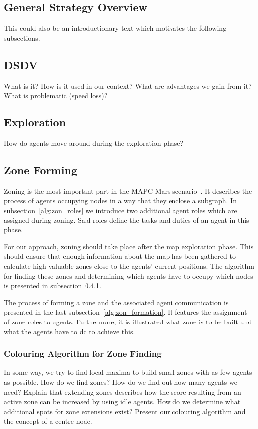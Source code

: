 \subsection{General Strategy Overview}
This could also be an introductionary text which motivates the following subsections.

\subsection{DSDV}
What is it? How is it used in our context? What are advantages we gain from it? What is problematic (speed loss)?

\subsection{Exploration}
How do agents move around during the exploration phase?

\subsection{Zone Forming}
Zoning is the most important part in the MAPC Mars scenario~\cite{ahlbrecht_mapc_2014}.%
It describes the process of agents occupying nodes in a way that they enclose a subgraph. In subsection~\ref{alg:zon_roles} we introduce two additional agent roles which are assigned during zoning. Said roles define the tasks and duties of an agent in this phase.

For our approach, zoning should take place after the map exploration phase. This should ensure that enough information about the map has been gathered to calculate high valuable zones close to the agents' current positions. The algorithm for finding these zones and determining which agents have to occupy which nodes is presented in subsection~\ref{alg:zon_colouring}.

The process of forming a zone and the associated agent communication is presented in the last subsection~\ref{alg:zon_formation}. It features the assignment of zone roles to agents. Furthermore, it is illustrated what zone is to be built and what the agents have to do to achieve this.

\subsubsection{Colouring Algorithm for Zone Finding}\label{alg:zon_colouring}
In some way, we try to find local maxima to build small zones with as few agents as possible. How do we find zones? How do we find out how many agents we need? Explain that extending zones describes how the score resulting from an active zone can be increased by using idle agents. How do we determine what additional spots for zone extensions exist?
Present our colouring algorithm and the concept of a centre node.


